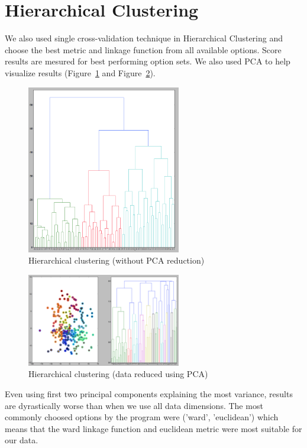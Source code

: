 \section{Hierarchical Clustering}
We also used single cross-validation technique in Hierarchical Clustering and
choose the best metric and linkage function from all available options. Score
results are mesured for best performing option sets. We also used PCA to help
visualize results (Figure~\ref{fig:hier_all} and Figure~\ref{fig:hier_pca}).
\begin{figure}[!tbh]
  \centering
  \includegraphics[width=0.6\textwidth]{figures/Hier_all_1}
  \caption{Hierarchical clustering (without PCA reduction)}
  \label{fig:hier_all}
\end{figure}
\begin{figure}[!tbh]
  \centering
  \includegraphics[width=0.6\textwidth]{figures/Hier_pca_2_1}
  \caption{Hierarchical clustering (data reduced using PCA)}
  \label{fig:hier_pca}
\end{figure}
Even using first two principal components explaining the most variance, results
are dyrastically worse than when we use all data dimensions. The most commonly
choosed options by the program were ('ward', 'euclidean') which means that the
ward linkage function and euclidean metric were most suitable for our data.

